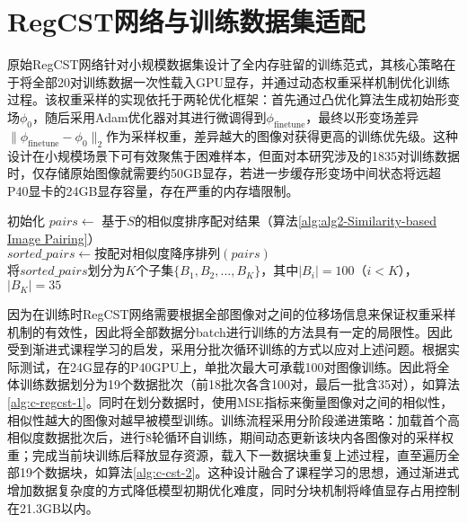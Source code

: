 \section{RegCST网络与训练数据集适配}

原始RegCST网络针对小规模数据集设计了全内存驻留的训练范式，其核心策略在于将全部20对训练数据一次性载入GPU显存，并通过动态权重采样机制优化训练过程。该权重采样的实现依托于两轮优化框架：首先通过凸优化算法生成初始形变场$\phi_0$，随后采用Adam优化器对其进行微调得到$\phi_{\text{finetune}}$，最终以形变场差异$\|\phi_{\text{finetune}} - \phi_0\|_2$作为采样权重，差异越大的图像对获得更高的训练优先级。这种设计在小规模场景下可有效聚焦于困难样本，但面对本研究涉及的1835对训练数据时，仅存储原始图像就需要约50GB显存，若进一步缓存形变场中间状态将远超P40显卡的24GB显存容量，存在严重的内存墙限制。

\begin{algorithm}[h]
    \label{alg:datablock}
    初始化 $pairs \gets$ 基于$S$的相似度排序配对结果（算法\ref{alg:alg2-Similarity-based Image Pairing}） \\
    $sorted\_pairs \gets \text{按配对相似度降序排列}(pairs)$ \\
    将$sorted\_pairs$划分为$K$个子集$\{B_1,B_2,...,B_K\}$，其中$|B_i|=100$（$i<K$），$|B_K|=35$ \\
    \label{alg:c-regcst-1}
\end{algorithm}

因为在训练时RegCST网络需要根据全部图像对之间的位移场信息来保证权重采样机制的有效性，因此将全部数据分batch进行训练的方法具有一定的局限性。因此受到渐进式课程学习的启发，采用分批次循环训练的方式以应对上述问题。根据实际测试，在24G显存的P40GPU上，单批次最大可承载100对图像训练。因此将全体训练数据划分为19个数据批次（前18批次各含100对，最后一批含35对），如算法\ref{alg:c-regcst-1}。同时在划分数据时，使用MSE指标来衡量图像对之间的相似性，相似性越大的图像对越早被模型训练。训练流程采用分阶段递进策略：加载首个高相似度数据批次后，进行8轮循环自训练，期间动态更新该块内各图像对的采样权重；完成当前块训练后释放显存资源，载入下一数据块重复上述过程，直至遍历全部19个数据块，如算法\ref{alg:c-cst-2}。这种设计融合了课程学习的思想，通过渐进式增加数据复杂度的方式降低模型初期优化难度，同时分块机制将峰值显存占用控制在21.3GB以内。

